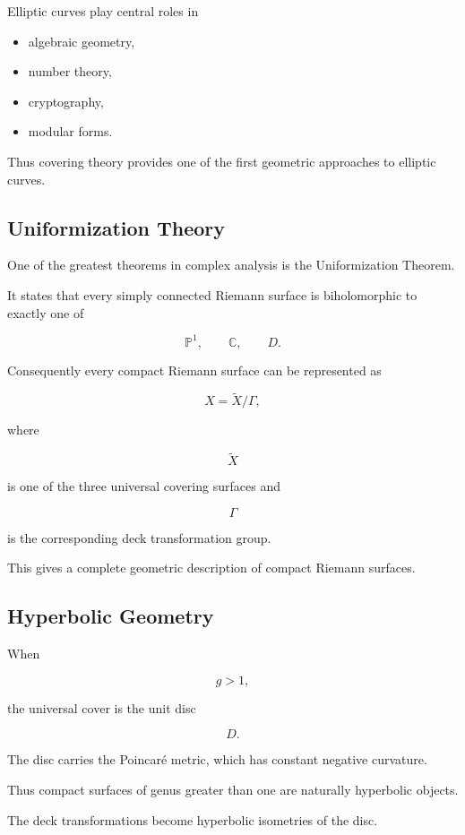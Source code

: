 \documentclass[12pt,a4paper]{article}
\theoremstyle{notespace}
\begin{document}
Elliptic curves play central roles in

\begin{itemize}
	\item algebraic geometry,
	\item number theory,
	\item cryptography,
	\item modular forms.
\end{itemize}

Thus covering theory provides one of the first geometric approaches to elliptic curves.

\subsection{Uniformization Theory}

One of the greatest theorems in complex analysis is the Uniformization Theorem.

It states that every simply connected Riemann surface is biholomorphic to exactly one of

\[
\mathbb P^1,
\qquad
\mathbb C,
\qquad
D.
\]

Consequently every compact Riemann surface can be represented as

\[
X
=
\widetilde X/\Gamma,
\]

where

\[
\widetilde X
\]

is one of the three universal covering surfaces and

\[
\Gamma
\]

is the corresponding deck transformation group.

This gives a complete geometric description of compact Riemann surfaces.

\subsection{Hyperbolic Geometry}

When

\[
g>1,
\]

the universal cover is the unit disc

\[
D.
\]

The disc carries the Poincaré metric, which has constant negative curvature.

Thus compact surfaces of genus greater than one are naturally hyperbolic objects.

The deck transformations become hyperbolic isometries of the disc.
\end{document}
